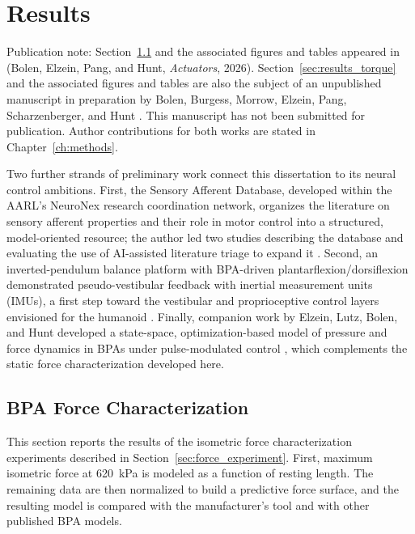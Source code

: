 \chapter{Results}\label{ch:results}
\graphicspath{{./figs/Results/}{./figs/Aim1/}{./figs/Aim2/}{./figs/Preliminary/}}

{\doublespacing\normalsize\upshape
\noindent Publication note: Section~\ref{sec:results_force} and the associated figures and tables appeared in \citet{bolen_2026} (Bolen, Elzein, Pang, and Hunt, \emph{Actuators}, 2026). Section~\ref{sec:results_torque} and the associated figures and tables are also the subject of an unpublished manuscript in preparation by Bolen, Burgess, Morrow, Elzein, Pang, Scharzenberger, and Hunt \citep{bolen_isometric_2025}. This manuscript has not been submitted for publication. Author contributions for both works are stated in Chapter~\ref{ch:methods}.\par}

Two further strands of preliminary work connect this dissertation to its neural control ambitions. First, the Sensory Afferent Database, developed within the AARL's NeuroNex research coordination network, organizes the literature on sensory afferent properties and their role in motor control into a structured, model-oriented resource; the author led two studies describing the database and evaluating the use of AI-assisted literature triage to expand it \citep{bolen_sensory_2023, bolen_using_2024}. Second, an inverted-pendulum balance platform with BPA-driven plantarflexion/dorsiflexion demonstrated pseudo-vestibular feedback with inertial measurement units (IMUs), a first step toward the vestibular and proprioceptive control layers envisioned for the humanoid \citep{bolen_balance_2024, bolen_selfbalancing_2024, bolen_selfbalancing_srs_2024}. Finally, companion work by Elzein, Lutz, Bolen, and Hunt developed a state-space, optimization-based model of pressure and force dynamics in BPAs under pulse-modulated control \citep{elzein_pressure_2025}, which complements the static force characterization developed here.

\section{BPA Force Characterization}\label{sec:results_force}

This section reports the results of the isometric force characterization experiments described in Section~\ref{sec:force_experiment}. First, maximum isometric force at \qty{620}{\kPa} is modeled as a function of resting length. The remaining data are then normalized to build a predictive force surface, and the resulting model is compared with the manufacturer's tool and with other published BPA models.


